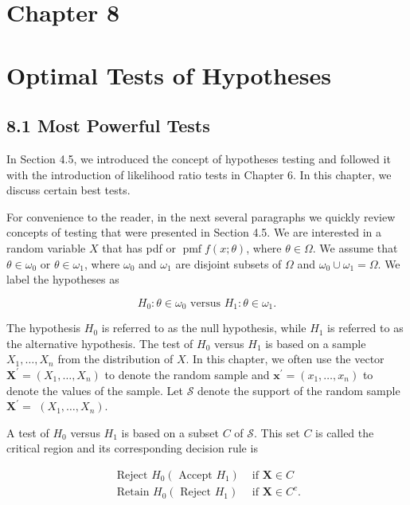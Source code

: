 \section*{Chapter 8}
\section*{Optimal Tests of Hypotheses}
\subsection*{8.1 Most Powerful Tests}
In Section 4.5, we introduced the concept of hypotheses testing and followed it with the introduction of likelihood ratio tests in Chapter 6. In this chapter, we discuss certain best tests.

For convenience to the reader, in the next several paragraphs we quickly review concepts of testing that were presented in Section 4.5. We are interested in a random variable $X$ that has pdf or $\operatorname{pmf} f(x ; \theta)$, where $\theta \in \Omega$. We assume that $\theta \in \omega_{0}$ or $\theta \in \omega_{1}$, where $\omega_{0}$ and $\omega_{1}$ are disjoint subsets of $\Omega$ and $\omega_{0} \cup \omega_{1}=\Omega$. We label the hypotheses as


\begin{equation*}
H_{0}: \theta \in \omega_{0} \text { versus } H_{1}: \theta \in \omega_{1} . \tag{8.1.1}
\end{equation*}


The hypothesis $H_{0}$ is referred to as the null hypothesis, while $H_{1}$ is referred to as the alternative hypothesis. The test of $H_{0}$ versus $H_{1}$ is based on a sample $X_{1}, \ldots, X_{n}$ from the distribution of $X$. In this chapter, we often use the vector $\mathbf{X}^{\prime}=\left(X_{1}, \ldots, X_{n}\right)$ to denote the random sample and $\mathbf{x}^{\prime}=\left(x_{1}, \ldots, x_{n}\right)$ to denote the values of the sample. Let $\mathcal{S}$ denote the support of the random sample $\mathbf{X}^{\prime}=$ $\left(X_{1}, \ldots, X_{n}\right)$.

A test of $H_{0}$ versus $H_{1}$ is based on a subset $C$ of $\mathcal{S}$. This set $C$ is called the critical region and its corresponding decision rule is

\[
\begin{array}{ll}
\text { Reject } H_{0}\left(\text { Accept } H_{1}\right) & \text { if } \mathbf{X} \in C  \tag{8.1.2}\\
\text { Retain } H_{0}\left(\text { Reject } H_{1}\right) & \text { if } \mathbf{X} \in C^{c} .
\end{array}
\]

